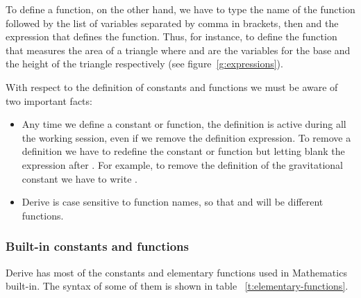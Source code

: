 To define a function, on the other hand, we have to type the name of the function followed by the list of variables separated by comma in brackets, then \command{:=} and the expression that defines the function. 
Thus, for instance, to define the function that measures the area of a triangle  where  and  are the variables for the base and the height of the triangle respectively (see figure~\ref{g:expressions}).

With respect to the definition of constants and functions we must be aware of two important facts: 

\begin{itemize}
\item Any time we define a constant or function, the definition is active during all the working session, even if we remove the definition expression.
To remove a definition we have to redefine the constant or function but letting blank the expression after \command{:=}.
For example, to remove the definition of the gravitational constant we have to write .

\item Derive is case sensitive to function names, so that  and  will be different functions.
\end{itemize}

\subsubsection*{Built-in constants and functions}
Derive has most of the constants and elementary functions used in Mathematics built-in. The syntax of some of them is shown in table ~\ref{t:elementary-functions}.

